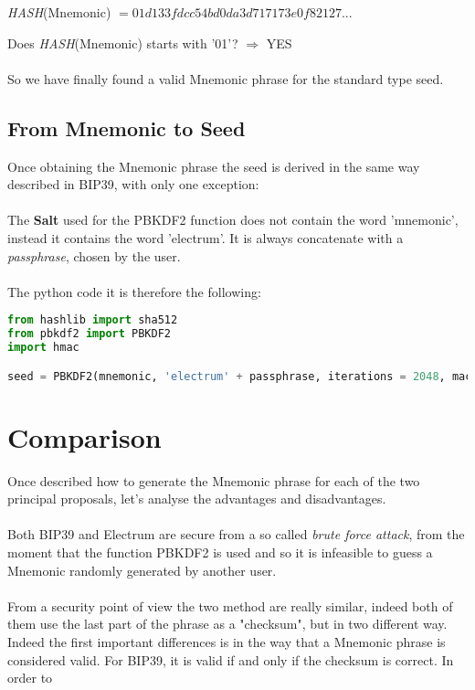 \begin{center}
	\textit{HASH}(Mnemonic) $= 01d133fdcc54bd0da3d717173e0f82127...$
\end{center}
Does \textit{HASH}(Mnemonic) starts with '01'? $\Rightarrow$ YES
\\ \\
So we have finally found a valid Mnemonic phrase for the standard type seed.


\subsection{From Mnemonic to Seed}
Once obtaining the Mnemonic phrase the seed is derived in the same way described in BIP39, with only one exception:
\\ \\
The \textbf{Salt} used for the PBKDF2 function does not contain the word 'mnemonic', instead it contains the word 'electrum'. It is always concatenate with a \textit{passphrase}, chosen by the user.
\\ \\
The python code it is therefore the following:  

\begin{lstlisting}[language=Python]
from hashlib import sha512
from pbkdf2 import PBKDF2
import hmac

seed = PBKDF2(mnemonic, 'electrum' + passphrase, iterations = 2048, macmodule = hmac, digestmodule = sha512).read(64)
\end{lstlisting}


\section{Comparison}
Once described how to generate the Mnemonic phrase for each of the two principal proposals, let's analyse the advantages and disadvantages.
\\ \\
Both BIP39 and Electrum are secure from a so called \textit{brute force attack}, from the moment that the function PBKDF2 is used and so it is infeasible to guess a Mnemonic randomly generated by another user.
\\ \\ 
From a security point of view the two method are really similar, indeed both of them use the last part of the phrase as a "checksum", but in two different way. \\ 
Indeed the first important differences is in the way that a Mnemonic phrase is considered valid. For BIP39, it is valid if and only if the checksum is correct. In order to  


